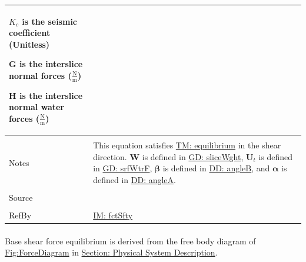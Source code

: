 \documentclass[12pt]{article}
\begin{document}
\begin{minipage}{\textwidth}
\begin{tabular}{>{\raggedright}p{}>{\raggedright\arraybackslash}p{}}
\begin{symbDescription}
              \item{${K_{c}}$ is the seismic coefficient (Unitless)}
              \item{$\mathbf{G}$ is the interslice normal forces ($\frac{\text{N}}{\text{m}}$)}
              \item{$\mathbf{H}$ is the interslice normal water forces ($\frac{\text{N}}{\text{m}}$)}
              \end{symbDescription}
\\ \midrule \\
Notes & This equation satisfies \hyperref[TM:equilibrium]{TM: equilibrium} in the shear direction. $\mathbf{W}$ is defined in \hyperref[GD:sliceWght]{GD: sliceWght}, ${\mathbf{U}_{t}}$ is defined in \hyperref[GD:srfWtrF]{GD: srfWtrF}, $\mathbf{β}$ is defined in \hyperref[DD:angleB]{DD: angleB}, and $\mathbf{α}$ is defined in \hyperref[DD:angleA]{DD: angleA}.
        
\\ \midrule \\
Source & \cite{chen2005}
         
\\ \midrule \\
RefBy & \hyperref[IM:fctSfty]{IM: fctSfty}
        
\\ \bottomrule
\end{tabular}
\end{minipage}
\paragraph{}
\label{GD:bsShrFEqDeriv}
Base shear force equilibrium is derived from the free body diagram of \hyperref[Figure:ForceDiagram]{Fig:ForceDiagram} in \hyperref[Sec:PhysSyst]{Section: Physical System Description}.
\end{document}
